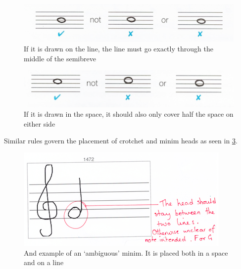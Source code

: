 \begin{figure}[h!]
  \includegraphics[width=\linewidth]{gfx/basic/semibreve-on-line.png}
  \centering
  \caption{If it is drawn on the line, the line must go exactly through the middle of the semibreve}
  \label{fig:semibreve-on-line}
\end{figure}

\begin{figure}[h!]
  \centering
  \includegraphics[width=\linewidth]{gfx/basic/semibreve-on-space.png}
  \caption{If it is drawn in the space, it should also only cover half the space on either side}
  \label{fig:semibreve-on-space}
\end{figure}

Similar rules govern the placement of crotchet and minim heads as seen in \cref{fig:mistake-note-ambig}.

\begin{figure}[hbt]
  \centering
  \includegraphics[height=\linewidth]{gfx/teacher-notes/mistake-notehead-ambiguous.png}
  \caption{And example of an `ambiguous' minim. It is placed both in a space and on a line}
  \label{fig:mistake-note-ambig}
\end{figure}


